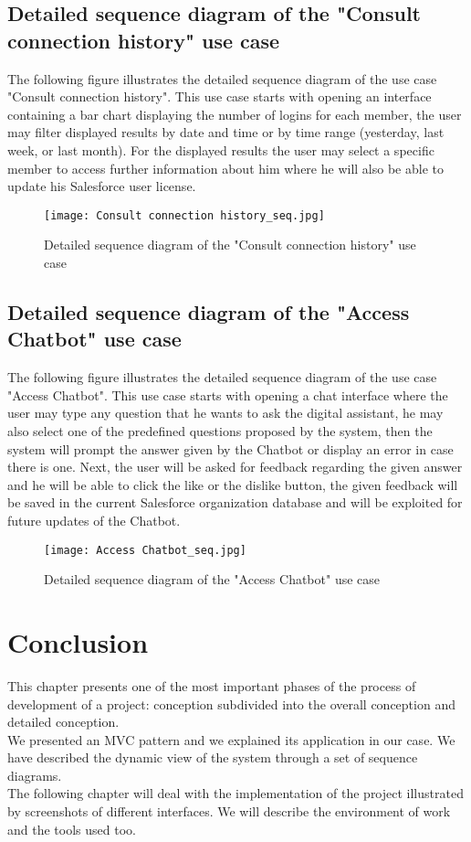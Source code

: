 \subsection{Detailed sequence diagram of the "Consult connection history" use case}
The following figure illustrates the detailed sequence diagram of the use case
"Consult connection history".
This use case starts with opening an interface containing a bar chart displaying the number of logins for each member, the user may filter displayed results by date and time or by time range (yesterday, last week, or last month). For the displayed results the user may select a specific member to access further information about him where he will also be able to update his Salesforce user license.
\begin{figure}[H]%
    \center   
    \texttt{[image: Consult connection history\_seq.jpg]}
    \caption{Detailed sequence diagram of the "Consult connection history" use case}
\end{figure}
\subsection{Detailed sequence diagram of the "Access Chatbot" use case}
The following figure illustrates the detailed sequence diagram of the use case
"Access Chatbot".
This use case starts with opening a chat interface where the user may type any question that he wants to ask the digital assistant, he may also select one of the predefined questions proposed by the system, then the system will prompt the answer given by the Chatbot or display an error in case there is one. Next, the user will be asked for feedback regarding the given answer and he will be able to click the like or the dislike button, the given feedback will be saved in the current Salesforce organization database and will be exploited for future updates of the Chatbot.
\begin{figure}[H]%
    \center   
    \texttt{[image: Access Chatbot\_seq.jpg]}
    \caption{Detailed sequence diagram of the "Access Chatbot" use case}
\end{figure}
\section*{Conclusion}
This chapter presents one of the most important phases of the process of
development of a project: conception subdivided into the overall conception
and detailed conception.\\
We presented an MVC pattern and we
explained its application in our case. We have described the dynamic view
of the system through a set of sequence diagrams.\\
The following chapter will deal with the implementation of the project illustrated by screenshots of different interfaces. We will describe the environment of
work and the tools used too.